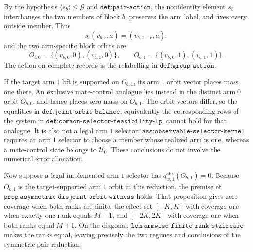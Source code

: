 By the hypothesis \(\langle s_b\rangle\le\mathcal G\) and \(\texttt{def:pair-action}\), the nonidentity element \(s_b\) interchanges the two members of block \(b\), preserves the arm label, and fixes every outside member. Thus
\[
s_b(v_{b,r},a)=(v_{b,1-r},a),
\]
and the two arm-specific block orbits are
\[
O_{b,0}=\{(v_{b,0},0),(v_{b,1},0)\},\qquad O_{b,1}=\{(v_{b,0},1),(v_{b,1},1)\}.
\tag{1}
\]
The action on complete records is the relabelling in \(\texttt{def:group-action}\).

If the target arm \(1\) lift is supported on \(O_{b,1}\), its arm \(1\) orbit vector places mass one there. An exclusive mate-control analogue lies instead in the distinct arm \(0\) orbit \(O_{b,0}\), and hence places zero mass on \(O_{b,1}\). The orbit vectors differ, so the equalities in \(\texttt{def:joint-orbit-balance}\), equivalently the corresponding rows of the system in \(\texttt{def:common-selector-feasibility-lp}\), cannot hold for that analogue. It is also not a legal arm \(1\) selector: \(\texttt{ass:observable-selector-kernel}\) requires an arm \(1\) selector to choose a member whose realized arm is one, whereas a mate-control state belongs to \(\mathcal U_0\). These conclusions do not involve the numerical error allocation.

Now suppose a legal implemented arm \(1\) selector has \(q^{\mathrm{obs}}_{w,1}(O_{b,1})=0\). Because \(O_{b,1}\) is the target-supported arm \(1\) orbit in this reduction, the premise of \(\texttt{prop:asymmetric-disjoint-orbit-witness}\) holds. That proposition gives zero coverage when both ranks are finite, the effect set \([-K,K]\) with coverage one when exactly one rank equals \(M+1\), and \([-2K,2K]\) with coverage one when both ranks equal \(M+1\). On the diagonal, \(\texttt{lem:armwise-finite-rank-staircase}\) makes the ranks equal, leaving precisely the two regimes and conclusions of the symmetric pair reduction.